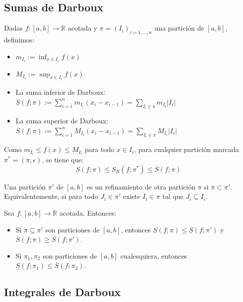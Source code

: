 \documentclass[11pt]{article}
\begin{document}
\subsection{Sumas de Darboux}
\label{sec:darboux}

\begin{definition}
Dadas $f:[a,b] \rightarrow \mathbb{R}$ acotada y $\pi = (I_i)_{i=1,\dots,n}$ una partición de $[a,b]$, definimos:
\begin{itemize}
    \item $m_{I_i} := \inf_{x \in I_i} f(x)$
    \item $M_{I_i} := \sup_{x \in I_i} f(x)$
    \item La suma inferior de Darboux: $\underline{S}(f; \pi) := \sum_{i=1}^{n} m_{I_i}(x_i - x_{i-1}) = \sum_{I_i \in \pi} m_{I_i} |I_i|$
    \item La suma superior de Darboux: $\overline{S}(f; \pi) := \sum_{i=1}^{n} M_{I_i}(x_i - x_{i-1}) = \sum_{I_i \in \pi} M_{I_i} |I_i|$
\end{itemize}
\end{definition}

\begin{remark}
Como $m_{I_i} \le f(x) \le M_{I_i}$ para todo $x \in I_i$, para cualquier partición marcada $\pi^* = (\pi, \epsilon)$, se tiene que:
$$ \underline{S}(f; \pi) \le S_R(f; \pi^*) \le \overline{S}(f; \pi) $$
\end{remark}

\begin{definition}[Refinamiento]
Una partición $\pi'$ de $[a,b]$ es un refinamiento de otra partición $\pi$ si $\pi \subset \pi'$. Equivalentemente, si para todo $J_i \in \pi'$ existe $I_i \in \pi$ tal que $J_i \subseteq I_i$.
\end{definition}

\begin{proposition}
Sea $f:[a,b] \rightarrow \mathbb{R}$ acotada. Entonces:
\begin{itemize}
    \item Si $\pi \subseteq \pi'$ son particiones de $[a,b]$, entonces $\underline{S}(f;\pi) \le \underline{S}(f;\pi')$ y $\overline{S}(f;\pi) \ge \overline{S}(f;\pi')$.
    \item Si $\pi_1, \pi_2$ son particiones de $[a,b]$ cualesquiera, entonces $\underline{S}(f;\pi_1) \le \overline{S}(f;\pi_2)$.
\end{itemize}
\end{proposition}

\subsection{Integrales de Darboux}
\label{sec:darboux-integrals}
\end{document}
